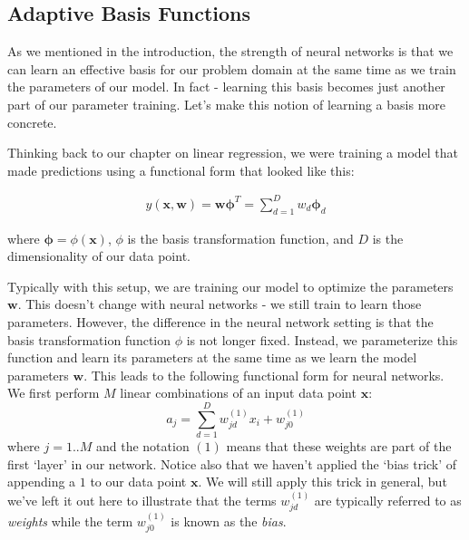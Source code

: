 \subsection{Adaptive Basis Functions}
As we mentioned in the introduction, the strength of neural networks is that we can learn an effective basis for our problem domain at the same time as we train the parameters of our model. In fact - learning this basis becomes just another part of our parameter training. Let's make this notion of learning a basis more concrete.

Thinking back to our chapter on linear regression, we were training a model that made predictions using a functional form that looked like this:

\begin{align*}
	y(\textbf{x}, \textbf{w}) = \textbf{w} \boldsymbol{\phi}^{T} = \sum_{d=1}^{D} w_{d} \boldsymbol{\phi}_{d}
\end{align*}

where $\boldsymbol{\phi} = \phi(\textbf{x})$, $\phi$ is the basis transformation function, and $D$ is the dimensionality of our data point.

Typically with this setup, we are training our model to optimize the parameters $\textbf{w}$. This doesn't change with neural networks - we still train to learn those parameters. However, the difference in the neural network setting is that the basis transformation function $\phi$ is not longer fixed. Instead, we parameterize this function and learn its parameters at the same time as we learn the model parameters $\textbf{w}$. This leads to the following functional form for neural networks. We first perform $M$ linear combinations of an input data point $\textbf{x}$:
\begin{equation} \label{basic-nn-form}
	a_{j} = \sum_{d=1}^{D} w_{jd}^{(1)} x_{i} + w_{j0}^{(1)}
\end{equation}
where $j=1..M$ and the notation $(1)$ means that these weights are part of the first `layer' in our network. Notice also that we haven't applied the `bias trick' of appending a $1$ to our data point $\textbf{x}$. We will still apply this trick in general, but we've left it out here to illustrate that the terms $w_{jd}^{(1)}$ are typically referred to as \textit{weights} while the term $w_{j0}^{(1)}$ is known as the \textit{bias}.

